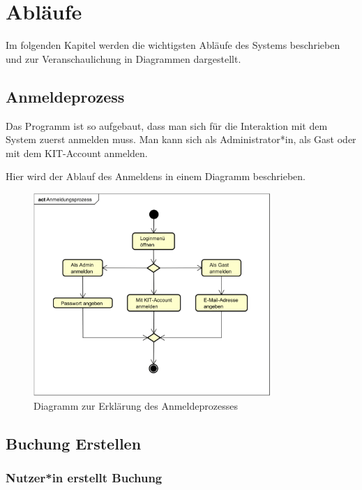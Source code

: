 
\chapter{Abläufe}
\label{ch:processes}
Im folgenden Kapitel werden die wichtigsten Abläufe des Systems beschrieben und zur Veranschaulichung in
Diagrammen dargestellt.

\section{Anmeldeprozess}
Das Programm ist so aufgebaut, dass man sich für die Interaktion mit dem System zuerst anmelden muss.
Man kann sich als Administrator*in, als Gast oder mit dem KIT-Account anmelden.

Hier wird der Ablauf des Anmeldens in einem Diagramm beschrieben.

\begin{figure}[ht]
    \centering
    \includegraphics[width=0.8\textwidth]{figures/activity/anmeldeprozess}
    \caption{Diagramm zur Erklärung des Anmeldeprozesses}
    \label{fig:login-diagram}
\end{figure}
\clearpage

\section{Buchung Erstellen}

\subsection{Nutzer*in erstellt Buchung}


